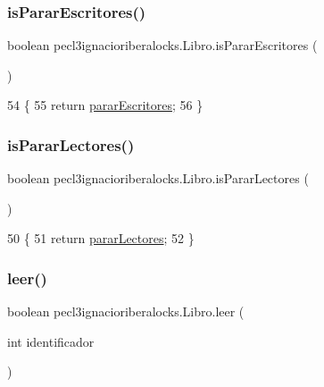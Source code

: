 \subsubsection{\texorpdfstring{is\+Parar\+Escritores()}{isPararEscritores()}}
{\footnotesize\ttfamily boolean pecl3ignacioriberalocks.\+Libro.\+is\+Parar\+Escritores (\begin{DoxyParamCaption}{ }\end{DoxyParamCaption})\hspace{0.3cm}{\ttfamily [inline]}}


\begin{DoxyCode}
54                                        \{
55         \textcolor{keywordflow}{return} \mbox{\hyperlink{classpecl3ignacioriberalocks_1_1_libro_af0d9e9c98f0aa4cd5a5aa0c0be6a9fc3}{pararEscritores}};
56     \}
\end{DoxyCode}
\mbox{\label{classpecl3ignacioriberalocks_1_1_libro_ad610273d7ceed921e576e0c92ab083c1}} 
\subsubsection{\texorpdfstring{is\+Parar\+Lectores()}{isPararLectores()}}
{\footnotesize\ttfamily boolean pecl3ignacioriberalocks.\+Libro.\+is\+Parar\+Lectores (\begin{DoxyParamCaption}{ }\end{DoxyParamCaption})\hspace{0.3cm}{\ttfamily [inline]}}


\begin{DoxyCode}
50                                      \{
51         \textcolor{keywordflow}{return} \mbox{\hyperlink{classpecl3ignacioriberalocks_1_1_libro_a78afb2edbbd4a15475672b3a967c223a}{pararLectores}};
52     \}
\end{DoxyCode}
\mbox{\label{classpecl3ignacioriberalocks_1_1_libro_ad4034cbd0be40ee9ed94da0bc98c0c66}} 
\subsubsection{\texorpdfstring{leer()}{leer()}}
{\footnotesize\ttfamily boolean pecl3ignacioriberalocks.\+Libro.\+leer (\begin{DoxyParamCaption}\item[{int}]{identificador }\end{DoxyParamCaption})\hspace{0.3cm}{\ttfamily [inline]}}


